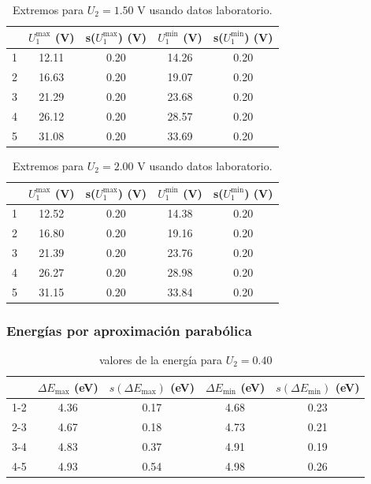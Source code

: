 \documentclass[12pt,a4paper]{article}
\numberwithin{equation}{section}
\numberwithin{figure}{section}
\begin{document}
 
\begin{table}[h!] 	 \centering 
\begin{tabular}{ccccc}
\hline & $U_1^{\max}$ (V) & s($U_1^{\max}$) (V) & $U_1^{\min}$ (V) & s($U_1^{\min}$) (V) \\
\hline
 1 & 12.11 & 0.20 & 14.26 & 0.20 \\
 2 & 16.63 & 0.20 & 19.07 & 0.20 \\
 3 & 21.29 & 0.20 & 23.68 & 0.20 \\
 4 & 26.12 & 0.20 & 28.57 & 0.20 \\
 5 & 31.08 & 0.20 & 33.69 & 0.20 \\
\hline
\end{tabular}\caption{Extremos para $U_2=1.50$ V usando datos laboratorio.} 
\label{Tab:lab-5} 
\end{table} 
 
 
\begin{table}[h!] 	 \centering 
\begin{tabular}{ccccc}
\hline & $U_1^{\max}$ (V) & s($U_1^{\max}$) (V) & $U_1^{\min}$ (V) & s($U_1^{\min}$) (V) \\
\hline
 1 & 12.52 & 0.20 & 14.38 & 0.20 \\
 2 & 16.80 & 0.20 & 19.16 & 0.20 \\
 3 & 21.39 & 0.20 & 23.76 & 0.20 \\
 4 & 26.27 & 0.20 & 28.98 & 0.20 \\
 5 & 31.15 & 0.20 & 33.84 & 0.20 \\
\hline
\end{tabular}\caption{Extremos para $U_2=2.00$ V usando datos laboratorio.} 
\label{Tab:lab-6} 
\end{table} 

\newpage

\subsubsection{Energías por aproximación parabólica} \label{Subsubsec:6.1.3}
\begin{table}[h!] \centering 
\begin{tabular}{ccccc} 
\hline  & $ \Delta E_{\max} $ (eV) & $s(\Delta E_{\max})$ (eV) & $ \Delta E_{\min} $ (eV) & $s(\Delta E_{\min})$ (eV) \\ \hline 
1-2 & 4.36 & 0.17 & 4.68 & 0.23 \\ 
2-3 & 4.67 & 0.18 & 4.73 & 0.21 \\ 
3-4 & 4.83 & 0.37 & 4.91 & 0.19 \\ 
4-5 & 4.93 & 0.54 & 4.98 & 0.26 \\ 
\hline 
\end{tabular}\caption{valores de la energía para $U_2=0.40$} 
\label{Tab:E-parabola-1} 
\end{table} 
\end{document}
